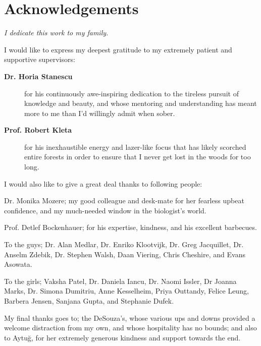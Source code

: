 \chapter*{Acknowledgements}
\vfill
\textit{\large I dedicate this work to my family.}

\vfill

\noindent
I would like to express my deepest gratitude to my extremely patient and supportive supervisors:
\vspace{-5pt}
\begin{description}
\item[\bf Dr. Horia Stanescu]{for his continuously awe-inspiring dedication to the tireless pursuit of knowledge and beauty, and whose mentoring and understanding has meant more to me than I'd willingly admit when sober.}
\item[\bf Prof. Robert Kleta]{for his inexhaustible energy and lazer-like focus that has likely scorched entire forests in order to ensure that I never get lost in the woods for too long.}
\end{description}

\vfill
\begin{spacing}{1.3}
\noindent
I would also like to give a great deal thanks to following people:
\vspace{-8pt}
\begin{description}
\item{{Dr. Monika Mozere;} my good colleague and desk-mate for her fearless upbeat confidence, and my much-needed window in the biologist's world.}
\item{{Prof. Detlef Bockenhauer;} for his expertise, kindness, and his excellent barbecues.}
\item{{To the guys;} Dr. Alan Medlar, Dr. Enriko Klootvijk, Dr. Greg Jacquillet, Dr. Anselm Zdebik, Dr. Stephen Walsh, Daan Viering, Chris Cheshire, and Evans Asowata.}
\item{{To the girls;} Vaksha Patel, Dr. Daniela Iancu, Dr. Naomi Issler, Dr Joanna Marks, Dr. Simona Dumitriu, Anne Kesselheim, Priya Outtandy, Felice Leung, Barbera Jensen, Sanjana Gupta, and Stephanie Dufek.}
\end{description}
\end{spacing}

\vfill
\noindent
My final thanks goes to; the DeSouza's, whose various ups and downs provided a welcome distraction from my own, and whose hospitality has no bounds; and also to Aytu\u{g}, for her extremely generous kindness and support towards the end.